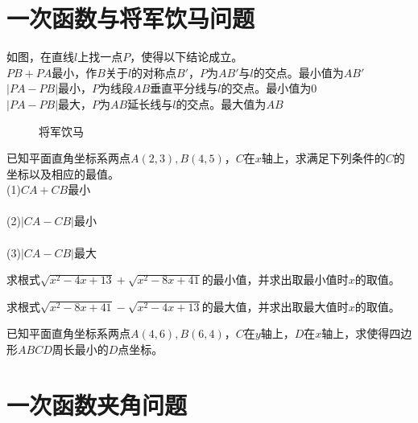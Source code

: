 \section{一次函数与将军饮马问题}
\begin{theorem}
    如图，在直线$l$上找一点$P$，使得以下结论成立。 \\
    $PB+PA$最小，作$B$关于$l$的对称点$B'$，$P$为$AB'$与$l$的交点。最小值为$AB'$\\
    $|PA-PB|$最小，$P$为线段$AB$垂直平分线与$l$的交点。最小值为0 \\
    $|PA-PB|$最大，$P$为$AB$延长线与$l$的交点。最大值为$AB$ \\
\end{theorem}
\begin{figure}[ht]
    \resizebox{4cm}{!}{}
    \caption{将军饮马}
\end{figure}
\begin{problem}
已知平面直角坐标系两点$A(2,3),B(4,5)$，$C$在$x$轴上，求满足下列条件的$C$的坐标以及相应的最值。\\
(1)$CA+CB$最小 \\
\\
(2)$|CA-CB|$最小 \\
\\
(3)$|CA-CB|$最大 \\
\end{problem}
\begin{problem}
求根式$\sqrt{x^2-4x+13}+\sqrt{x^2-8x+41}$的最小值，并求出取最小值时$x$的取值。 \\
\end{problem}
\begin{problem}
求根式$\sqrt{x^2-8x+41}-\sqrt{x^2-4x+13}$的最大值，并求出取最大值时$x$的取值。 \\
\end{problem}
\begin{problem}
已知平面直角坐标系两点$A(4,6),B(6,4)$，$C$在$y$轴上，$D$在$x$轴上，求使得四边形$ABCD$周长最小的$D$点坐标。\\
\end{problem}

\clearpage
\section{一次函数夹角问题}
\clearpage
